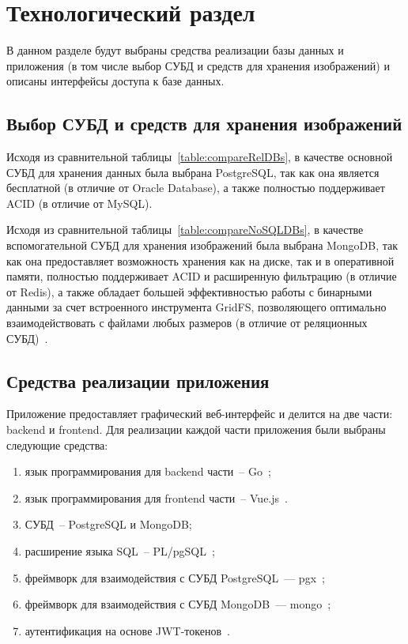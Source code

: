 \chapter{Технологический раздел}

В данном разделе будут выбраны средства реализации базы данных и приложения (в том числе выбор СУБД и средств для хранения изображений) и описаны интерфейсы доступа к базе данных.

\section{Выбор СУБД и средств для хранения изображений}

Исходя из сравнительной таблицы~\ref{table:compareRelDBs}, в качестве основной СУБД для хранения данных была выбрана PostgreSQL, так как она является бесплатной (в отличие от Oracle Database), а также полностью поддерживает ACID (в отличие от MySQL).

Исходя из сравнительной таблицы~\ref{table:compareNoSQLDBs}, в качестве вспомогательной СУБД для хранения изображений была выбрана MongoDB, так как она предоставляет возможность хранения как на диске, так и в оперативной памяти, полностью поддерживает ACID и расширенную фильтрацию (в отличие от Redis), а также обладает большей эффективностью работы с бинарными данными за счет встроенного инструмента GridFS, позволяющего оптимально взаимодействовать с файлами любых размеров (в отличие от реляционных СУБД)~\cite{cmpNosqlSCDB, cmpStoreBinary, cmpStoreBinary1}.

\section{Средства реализации приложения}

Приложение предоставляет графический веб-интерфейс и делится на две части: backend и frontend.
Для реализации каждой части приложения были выбраны следующие средства:
\begin{enumerate}
	\item язык программирования для backend части~-- Go~\cite{go};
	\item язык программирования для frontend части~-- Vue.js~\cite{vue}.
	\item СУБД~-- PostgreSQL и MongoDB;
	\item расширение языка SQL~-- PL/pgSQL~\cite{plpg};
	\item фреймворк для взаимодействия с СУБД PostgreSQL~--- pgx~\cite{pgx};
	\item фреймворк для взаимодействия с СУБД MongoDB~--- mongo~\cite{mongogo};
	\item аутентификация на основе JWT-токенов~\cite{jwt}.
\end{enumerate}

